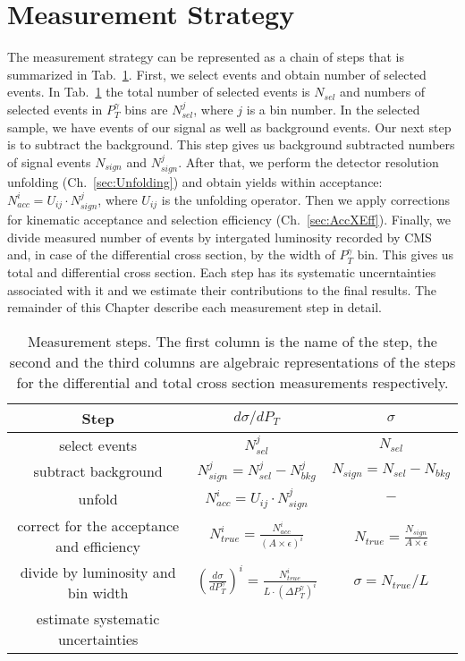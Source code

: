 \section{Measurement Strategy}
\label{sec:AN_WgMeasStrategy}

The measurement strategy can be represented as a chain of steps that is summarized in Tab.~\ref{tab:analysisOutline}. First, we select events and obtain number of selected events. In Tab.~\ref{tab:analysisOutline} the total number of selected events is $N_{sel}$ and numbers of selected events in $P_T^{\gamma}$ bins are $N_{sel}^j$, where $j$ is a bin number. In the selected sample, we have events of our signal as well as background events. Our next step is to subtract the background. This step gives us background subtracted numbers of signal events $N_{sign}$ and $N_{sign}^j$. After that, we perform the detector resolution unfolding (Ch.~\ref{sec:Unfolding}) and obtain yields within acceptance: $N_{acc}^i = U_{ij} \cdot N_{sign}^j$, where $U_{ij}$ is the unfolding operator. Then we apply corrections for kinematic acceptance and selection efficiency (Ch.~\ref{sec:AccXEff}). Finally, we divide measured number of events by intergated luminosity recorded by CMS and, in case of the differential cross section, by the width of $P_T^{\gamma}$ bin. This gives us total and differential cross section. Each step has its systematic uncerntainties associated with it and we estimate their contributions to the final results. The remainder of this Chapter describe each measurement step in detail.



\begin{table}[h]
  \small
  \begin{center}
  \caption{Measurement steps. The first column is the name of the step, the second and the third columns are algebraic representations of the steps for the differential and total cross section measurements respectively. }
  \begin{tabular}{|c|c|c|}
    \hline
    Step & $d\sigma/dP_{T}$ & $\sigma$ \\ \hline
    select events & $N_{sel}^j$ &    $N_{sel}$       \\ \hline
    subtract background & $N_{sign}^j = N_{sel}^j - N_{bkg}^j$ &    $N_{sign}=N_{sel}-N_{bkg}$       \\ \hline
    unfold   & $N_{acc}^i = U_{ij} \cdot N_{sign}^j$ &    $-$       \\ \hline
    correct for the acceptance and efficiency & $N_{true}^i = \frac{N_{acc}^i}{(A \times\epsilon)^i}$ &  $N_{true}=\frac{N_{sign}}{A\times\epsilon}$       \\ \hline
    divide by luminosity and bin width & $ \left( \frac{d\sigma}{dP_{T}^\gamma} \right) ^i = \frac{N_{true}^i}{L \cdot (\Delta P_T^\gamma)^i}$  &  $\sigma = N_{true}/L$       \\ \hline
    estimate systematic uncertainties &  &         \\ \hline
  \end{tabular}
  \label{tab:analysisOutline}
  \end{center}
\end{table}

